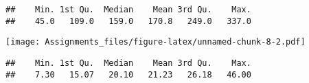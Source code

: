 \documentclass[
]{article}
\newenvironment{Shaded}{\begin{snugshade}}{\end{snugshade}}
\newcommand{\AttributeTok}[1]{\textcolor[rgb]{0.77,0.63,0.00}{#1}}
\newcommand{\FunctionTok}[1]{\textcolor[rgb]{0.00,0.00,0.00}{#1}}
\newcommand{\NormalTok}[1]{#1}
\newcommand{\SpecialCharTok}[1]{\textcolor[rgb]{0.00,0.00,0.00}{#1}}
\newcommand{\StringTok}[1]{\textcolor[rgb]{0.31,0.60,0.02}{#1}}
\begin{document}
\begin{Shaded}
\end{Shaded}

\begin{verbatim}
##    Min. 1st Qu.  Median    Mean 3rd Qu.    Max. 
##    45.0   109.0   159.0   170.8   249.0   337.0
\end{verbatim}

\begin{Shaded}
\end{Shaded}

\texttt{[image: Assignments\_files/figure-latex/unnamed-chunk-8-2.pdf]}

\begin{Shaded}
\end{Shaded}

\begin{verbatim}
##    Min. 1st Qu.  Median    Mean 3rd Qu.    Max. 
##    7.30   15.07   20.10   21.23   26.18   46.00
\end{verbatim}
\end{document}
